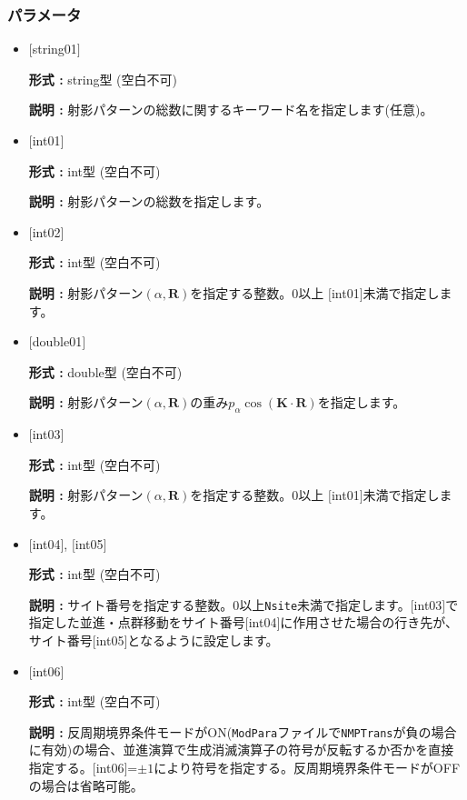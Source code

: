 \subsubsection{パラメータ}
 \begin{itemize}

   \item  $[$string01$]$
   
    {\bf 形式 :} string型 (空白不可)

   {\bf 説明 :} 射影パターンの総数に関するキーワード名を指定します(任意)。

   \item  $[$int01$]$
   
    {\bf 形式 :} int型 (空白不可)

   {\bf 説明 :} 射影パターンの総数を指定します。

  \item  $[$int02$]$
   
 {\bf 形式 :} int型 (空白不可)

{\bf 説明 :} 射影パターン$(\alpha, {\bm R})$を指定する整数。0以上 $[$int01$]${未満}で指定します。
 
  \item  $[$double01$]$
   
 {\bf 形式 :} double型 (空白不可)

{\bf 説明 :} 射影パターン$(\alpha, {\bm R})$の重み$p_{\alpha}\cos ({\bm K}\cdot {\bm R})$を指定します。
 
 \item  $[$int03$]$
   
   {\bf 形式 :} int型 (空白不可)

  {\bf 説明 :} 射影パターン$(\alpha, {\bm R})$を指定する整数。0以上 $[$int01$]${未満}で指定します。

 \item  $[$int04$]$, $[$int05$]$
   
   {\bf 形式 :} int型 (空白不可)

  {\bf 説明 :} サイト番号を指定する整数。0以上\verb|Nsite|{未満}で指定します。$[$int03$]$で指定した並進・点群移動をサイト番号$[$int04$]$に作用させた場合の行き先が、サイト番号$[$int05$]$となるように設定します。

 \item  $[$int06$]$
   
   {\bf 形式 :} int型 (空白不可)

  {\bf 説明 :} 反周期境界条件モードがON(\verb|ModPara|ファイルで\verb|NMPTrans|が負の場合に有効)の場合、並進演算で生成消滅演算子の符号が反転するか否かを直接指定する。$[$int06$]$=$\pm1$により符号を指定する。反周期境界条件モードがOFFの場合は省略可能。
\end{itemize}

